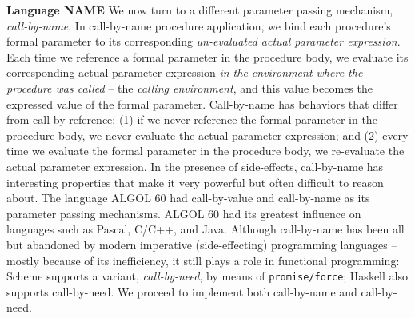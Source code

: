 \begin{minipage}[t]{\sw}
\slidenumber
\LARGE
{\bf Language NAME}\exx
We now turn to a different parameter passing mechanism,
{\em call-by-name}.
In call-by-name procedure application,
we bind each procedure's formal parameter
to its corresponding {\em un-evaluated actual parameter expression}.
Each time we reference a formal parameter in the procedure body,
we evaluate its corresponding actual parameter expression
{\em in the environment where the procedure was called}
-- the {\em calling environment},
and this value becomes the expressed value of the formal parameter.\exx
Call-by-name has behaviors that differ from call-by-reference:
(1)
if we never reference the formal parameter in the procedure body,
we never evaluate the actual parameter expression; and
(2)
every time we evaluate the formal parameter in the procedure body,
we re-evaluate the actual parameter expression.\exx
In the presence of side-effects, call-by-name has interesting
properties that make it very powerful
but often difficult to reason about.
The language ALGOL 60 had call-by-value and call-by-name
as its parameter passing mechanisms.
ALGOL 60 had its greatest influence on languages
such as Pascal, C/C++, and Java.
Although call-by-name has been all but abandoned
by modern imperative (side-effecting) programming languages --
mostly because of its inefficiency,
it still plays a role in functional programming:
Scheme supports a variant, {\em call-by-need},
by means of \verb'promise/force';
Haskell also supports call-by-need.
We proceed to implement both call-by-name and call-by-need.
\end{minipage}
\clearpage
